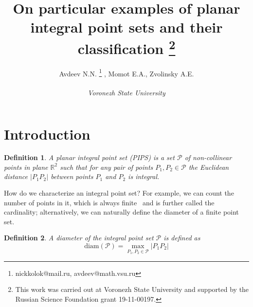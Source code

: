\documentclass[12pt]{article}
\theoremstyle{theorem}
\theoremstyle{dfn}
\newtheorem{dfn}{Definition}
\theoremstyle{remark}
\begin{document}






\title{
	On particular examples of planar integral point sets and their classification
	\footnote{
		This work was carried out at Voronezh State University and supported by the Russian Science
		Foundation grant 19-11-00197.
	}
}

\author{
	Avdeev N.N.
	\footnote{nickkolok@mail.ru, avdeev@math.vsu.ru}
	, Momot E.A., Zvolinsky A.E.
	\\
	\\
	\emph{Voronezh State University}
}

\maketitle


\section{Introduction}



\begin{dfn}\label{dfn1}
	A planar integral point set (PIPS) is a set $\mathcal{P}$
	of non-collinear points in plane $\mathbb{R}^{2}$ such that
	for any pair of points $P_{1}, P_{2} \in \mathcal{P}$
	the Euclidean distance $|P_{1}P_{2}|$
	between points $P_{1}$ and $P_{2}$ is integral.
\end{dfn}

How do we characterize an integral point set?
For example, we can count the number of points in it, which is always finite~\cite{anning1945integral,erdos1945integral}
and is further called the cardinality;
alternatively, we can naturally%
define the diameter of a finite point set.

\begin{dfn}
	A diameter of the integral point set $\mathcal{P}$ is defined as
	\begin{equation}
		\operatorname{diam(\mathcal{P})} = \underset{P_{1}, P_{2} \in
		\mathcal{P}}{\max} |P_{1}P_{2}|
	\end{equation}
\end{dfn}
\end{document}
